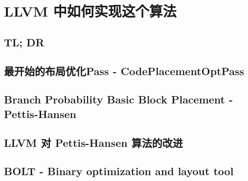 \section{LLVM 中如何实现这个算法}

\subsection{TL; DR}

\subsection{最开始的布局优化Pass - CodePlacementOptPass}

\subsection{Branch Probability Basic Block Placement - Pettis-Hansen}

\subsection{LLVM 对 Pettis-Hansen 算法的改进}

\subsection{BOLT - Binary optimization and layout tool}
